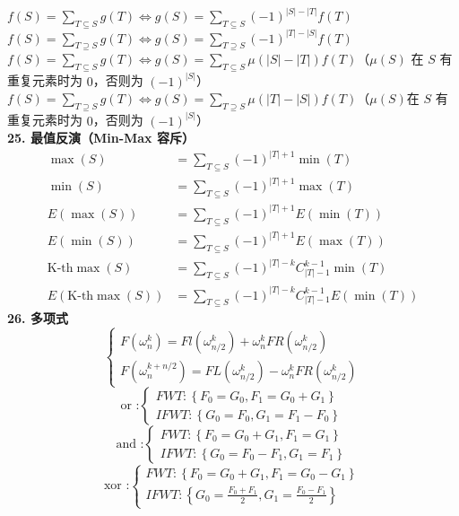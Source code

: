 $f(S)=\sum_{T\subseteq S}g(T)\Longleftrightarrow g(S)=\sum_{T\subseteq S}(-1)^{|S|-|T|}f(T)$ \\
$f(S)=\sum_{T\supseteq S}g(T)\Longleftrightarrow g(S)=\sum_{T\supseteq S}(-1)^{|T|-|S|}f(T)$ \\
$f(S)=\sum_{T\subseteq S}g(T)\Longleftrightarrow g(S)=\sum_{T\subseteq S}\mu(|S|-|T|)f(T)$（$\mu(S)$ 在 $S$ 有重复元素时为 $0$，否则为 $(-1)^{|S|}$） \\
$f(S)=\sum_{T\supseteq S}g(T)\Longleftrightarrow g(S)=\sum_{T\supseteq S}\mu(|T|-|S|)f(T)$（$\mu(S) $在 $S$ 有重复元素时为 $0$，否则为 $(-1)^{|S|}$） \\
\textbf{25. 最值反演（Min-Max 容斥）}
$$
\begin{aligned}
    \max(S)&=\sum_{T\subseteq S}(-1)^{|T|+1}\min(T)\\
    \min(S)&=\sum_{T\subseteq S}(-1)^{|T|+1}\max(T)\\
    E(\max(S))&=\sum_{T\subseteq S}(-1)^{|T|+1}E(\min(T))\\
    E(\min(S))&=\sum_{T\subseteq S}(-1)^{|T|+1}E(\max(T))\\
    \text{K-th}\max(S)&=\sum_{T\subseteq S}(-1)^{|T|-k}C_{|T|-1}^{k-1}\min(T)\\
    E(\text{K-th}\max(S))&=\sum_{T\subseteq S}(-1)^{|T|-k}C_{|T|-1}^{k-1}E(\min(T))
\end{aligned}
$$
\textbf{26. 多项式}
$$\begin{cases} F\left(\omega_{n}^{k}\right)=F l\left(\omega_{n / 2}^{k}\right)+\omega_{n}^{k} F R\left(\omega_{n / 2}^{k}\right) \\ F\left(\omega_{n}^{k+n / 2}\right)=F L\left(\omega_{n / 2}^{k}\right)-\omega_{n}^{k} F R\left(\omega_{n / 2}^{k}\right) \end{cases}$$
$$\text {or :}\begin{cases} FWT:\left\{F_{0}=G_{0}, F_{1}=G_{0}+G_{1}\right\} \\ IFWT:\left\{G_{0}=F_{0}, G_{1}=F_{1}-F_{0}\right\} \end{cases}$$
$$\text {and :}\begin{cases} FWT:\left\{F_{0}=G_{0}+G_{1}, F_{1}=G_{1}\right\} \\ IFWT:\left\{G_{0}=F_{0}-F_{1}, G_{1}=F_{1}\right\} \end{cases}$$
$$\text {xor :}\begin{cases} F W T:\left\{F_{0}=G_{0}+G_{1}, F_{1}=G_{0}-G_{1}\right\} \\ I F W T:\left\{G_{0}=\frac{F_{0}+F_{1}}{2}, G_{1}=\frac{F_{0}-F_{1}}{2}\right\} \end{cases}$$
